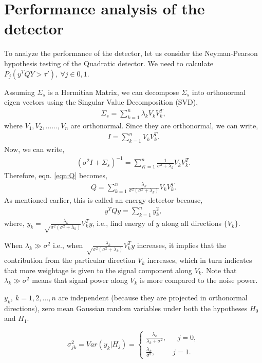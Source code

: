 \documentclass[a4paper,english,12pt]{article}
\begin{document}
\section{Performance analysis of the detector}
To analyze the performance of the detector, let us consider the Neyman-Pearson hypothesis testing of the Quadratic detector. We need to calculate $P_j(y^TQY>\tau'),~\forall j \in{0,1}$.
\par Assuming $\Sigma_s$ is a Hermitian Matrix, we can decompose $\Sigma_s$ into orthonormal eigen vectors using the Singular Value Decomposition (SVD), 
\begin{align}
 \Sigma_s = \sum_{k=1}^{n}\lambda_kV_kV_k^T,
\end{align}
where $V_1, V_2,......,V_n$ are orthonormal. Since they are orthonormal, we can write,
\begin{align*}
 I=\sum_{k=1}^{n}V_kV_k^T.
\end{align*}
Now, we can write,
\begin{align*}
 (\sigma^{2}I+\Sigma_s)^{-1}=\sum_{K=1}^{n}\frac{1}{\sigma^2+\lambda_k}V_kV_k^T.
\end{align*}
 Therefore, eqn. \eqref{eqn:Q} becomes,
\begin{align}
Q=\sum_{k=1}^{n}\frac{\lambda_k}{\sigma^2(\sigma^2+\lambda_k)}V_kV_k^T.
\end{align}
As mentioned earlier, this is called an energy detector because,
\begin{align*}
y^{T}Qy=\sum_{k=1}^{n}y_k^{2},
\end{align*}
where, $y_k=\sqrt\frac{\lambda_k}{\sigma^2(\sigma^2+\lambda_k)}V_k^Ty$, i.e., find energy of $y$ along all directions $\{V_k\}$.
\begin{note}
When $\lambda_k\gg\sigma^2$ i.e., when $\sqrt\frac{\lambda_k}{\sigma^2(\sigma^2+\lambda_k)}V_k^Ty$ increases, it implies that the contribution from the particular direction $V_k$ increases, which in turn indicates that more weightage is given to the signal component along $V_k$. Note that $\lambda_k\gg\sigma^2$ means that signal power along $V_k$ is more compared to the noise power.
\end{note}
\begin{note}
$y_k,~k=1,2,\dots,n$ are independent (because they are projected in orthonormal directions), zero mean Gaussian random variables under both the hypotheses $H_0$ and $H_1$.
\end{note}
\begin{equation*}
 \sigma_{jk}^2= Var\left({y_k}|{H_j}\right)
 =\begin{cases}
 	\frac{\lambda_k}{\lambda_k+\sigma^2}, \ \ \ \ \ \ \ j=0,\\
 	\frac{\lambda_k}{\sigma^2}, \ \ \ \ \ \ \ \ \ \ \ j=1.
 	\end{cases}
\end{equation*}
\end{document}
